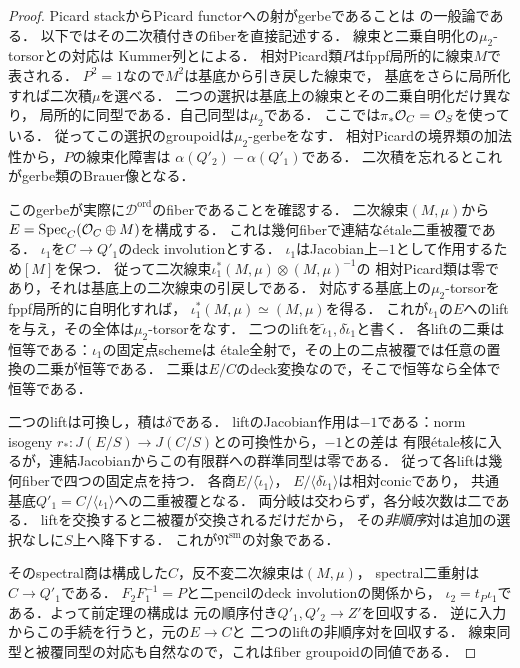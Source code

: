 \begin{proof}
Picard stackからPicard functorへの射がgerbeであることは
\cite[Lemma~108.9.1, Tag~0DME]{StacksRelativePicard}の一般論である．
以下ではその二次積付きのfiberを直接記述する．
線束と二乗自明化の$\mu_2$-torsorとの対応は
Kummer列と\cite[Tag~040Q]{StacksKummer}による．
相対Picard類$P$はfppf局所的に線束$M$で表される．
$P^2=1$なので$M^2$は基底から引き戻した線束で，
基底をさらに局所化すれば二次積$\mu$を選べる．
二つの選択は基底上の線束とその二乗自明化だけ異なり，
局所的に同型である．自己同型は$\mu_2$である．
ここでは$\pi_*\mathcal O_C=\mathcal O_S$を使っている．
従ってこの選択のgroupoidは$\mu_2$-gerbeをなす．
相対Picardの境界類の加法性から，$P$の線束化障害は
$\alpha(Q'_2)-\alpha(Q'_1)$である．
二次積を忘れるとこれがgerbe類のBrauer像となる．

このgerbeが実際に$\mathscr D^{\mathrm{ord}}$のfiberであることを確認する．
二次線束$(M,\mu)$から
$E=\operatorname{Spec}_C(\mathcal O_C\oplus M)$を構成する．
これは幾何fiberで連結な\'etale二重被覆である．
$\iota_1$を$C\to Q'_1$のdeck involutionとする．
$\iota_1$はJacobian上$-1$として作用するため$[M]$を保つ．
従って二次線束$\iota_1^*(M,\mu)\otimes(M,\mu)^{-1}$の
相対Picard類は零であり，それは基底上の二次線束の引戻しである．
対応する基底上の$\mu_2$-torsorをfppf局所的に自明化すれば，
$\iota_1^*(M,\mu)\simeq(M,\mu)$を得る．
これが$\iota_1$の$E$へのliftを与え，その全体は$\mu_2$-torsorをなす．
二つのliftを$\widetilde\iota_1,\delta\widetilde\iota_1$と書く．
各liftの二乗は恒等である：$\iota_1$の固定点schemeは
\'etale全射で，その上の二点被覆では任意の置換の二乗が恒等である．
二乗は$E/C$のdeck変換なので，そこで恒等なら全体で恒等である．

二つのliftは可換し，積は$\delta$である．
liftのJacobian作用は$-1$である：norm isogeny
$r_*:J(E/S)\to J(C/S)$との可換性から，$-1$との差は
有限\'etale核に入るが，連結Jacobianからこの有限群への群準同型は零である．
従って各liftは幾何fiberで四つの固定点を持つ．
各商$E/\langle\widetilde\iota_1\rangle$，
$E/\langle\delta\widetilde\iota_1\rangle$は相対conicであり，
共通基底$Q'_1=C/\langle\iota_1\rangle$への二重被覆となる．
両分岐は交わらず，各分岐次数は二である．
liftを交換すると二被覆が交換されるだけだから，
その\emph{非順序}対は追加の選択なしに$S$上へ降下する．
これが$\mathfrak N^{\mathrm{sm}}$の対象である．

そのspectral商は構成した$C$，反不変二次線束は$(M,\mu)$，
spectral二重射は$C\to Q'_1$である．
$F_2F_1^{-1}=P$と二pencilのdeck involutionの関係から，
$\iota_2=t_P\iota_1$である．よって前定理の構成は
元の順序付き$Q'_1,Q'_2\to Z'$を回収する．
逆に入力からこの手続を行うと，元の$E\to C$と
二つのliftの非順序対を回収する．
線束同型と被覆同型の対応も自然なので，これはfiber groupoidの同値である．
\end{proof}

